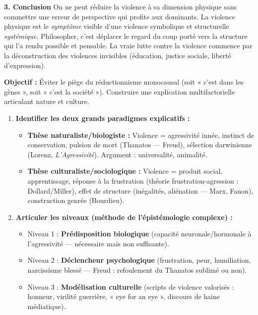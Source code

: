 \documentclass[11pt]{article}
\newcommand{\cle}[1]{{\popxbold\color{popdark}#1}}
\begin{document}
\begin{exoresolu}
\textbf{3. Conclusion}
On ne peut réduire la violence à sa dimension physique sans commettre une \cle{erreur de perspective} qui profite aux dominants. La violence physique est le \emph{symptôme} visible d'une violence symbolique et structurelle \emph{systémique}. Philosopher, c'est déplacer le regard du coup porté vers la structure qui l'a rendu possible et pensable. La vraie lutte contre la violence commence par la déconstruction des violences invisibles (éducation, justice sociale, liberté d'expression).
\end{exoresolu}

\begin{methode}
\textbf{Objectif :} Éviter le piège du \cle{réductionnisme monocausal} (soit « c'est dans les gènes », soit « c'est la société »). Construire une explication \cle{multifactorielle} articulant nature et culture.
\begin{enumerate}
    \item \textbf{Identifier les deux grands paradigmes explicatifs :}
        \begin{itemize}
            \item \textbf{Thèse naturaliste/biologiste :} Violence = \cle{agressivité innée}, instinct de conservation, pulsion de mort (\cle{Thanatos} — Freud), sélection darwinienne (Lorenz, \emph{L'Agressivité}). Argument : universalité, animalité.
            \item \textbf{Thèse culturaliste/sociologique :} Violence = \cle{produit social}, apprentissage, réponse à la frustration (théorie frustration-agression : Dollard/Miller), effet de structure (inégalités, aliénation — Marx, Fanon), construction genrée (Bourdieu).
        \end{itemize}
    \item \textbf{Articuler les niveaux (méthode de l'\cle{épistémologie complexe}) :}
        \begin{itemize}
            \item Niveau 1 : \textbf{Prédisposition biologique} (capacité neuronale/hormonale à l'agressivité — nécessaire mais non suffisante).
            \item Niveau 2 : \textbf{Déclencheur psychologique} (frustration, peur, humiliation, narcissisme blessé — Freud : \cle{refoulement} du Thanatos sublimé ou non).
            \item Niveau 3 : \textbf{Modélisation culturelle} (scripts de violence valorisés : honneur, virilité guerrière, « eye for an eye », discours de haine médiatique).

\end{itemize}
\end{enumerate}
\end{methode}
\end{document}
